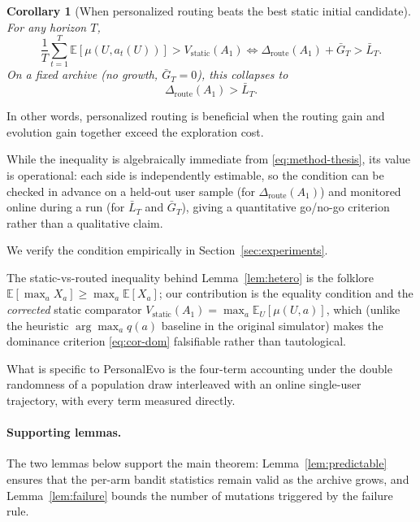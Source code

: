 \documentclass{article} %
\newtheorem{corollary}[theorem]{Corollary}
\providecommand{\E}{\mathbb{E}}
\begin{document}
\label{sec:method-cor-dom}

\begin{corollary}[When personalized routing beats the best static initial candidate]
\label{cor:dominance}
For any horizon $T$,
\begin{equation}
\label{eq:cor-dom}
\frac{1}{T}\sum_{t=1}^T \E[\mu(U, a_t(U))] > V_{\mathrm{static}}(A_1)
\iff
\Delta_{\mathrm{route}}(A_1) + \bar G_T > \bar L_T.
\end{equation}
On a fixed archive (no growth, $\bar G_T = 0$), this collapses to
\begin{equation}
\label{eq:cor-dom-fixed}
\Delta_{\mathrm{route}}(A_1) > \bar L_T.
\end{equation}
\end{corollary}

In other words, personalized routing is beneficial when the routing gain and evolution gain together exceed the exploration cost.

While the inequality is algebraically immediate from \eqref{eq:method-thesis}, its value is operational: each side is independently estimable, so the condition can be checked in advance on a held-out user sample (for $\Delta_{\mathrm{route}}(A_1)$) and monitored online during a run (for $\bar L_T$ and $\bar G_T$), giving a quantitative go/no-go criterion rather than a qualitative claim.

We verify the condition empirically in Section~\ref{sec:experiments}.

The static-vs-routed inequality behind Lemma~\ref{lem:hetero} is the folklore $\E[\max_a X_a]\ge\max_a\E[X_a]$; our contribution is the equality condition and the \emph{corrected} static comparator $V_{\mathrm{static}}(A_1)=\max_a\E_U[\mu(U,a)]$, which (unlike the heuristic $\arg\max_a q(a)$ baseline in the original simulator) makes the dominance criterion \eqref{eq:cor-dom} falsifiable rather than tautological.

What is specific to PersonalEvo is the four-term accounting under the double randomness of a population draw interleaved with an online single-user trajectory, with every term measured directly.

\paragraph{Supporting lemmas.}

\label{sec:method-supporting}

The two lemmas below support the main theorem: Lemma~\ref{lem:predictable} ensures that the per-arm bandit statistics remain valid as the archive grows, and Lemma~\ref{lem:failure} bounds the number of mutations triggered by the failure rule.
\end{document}
